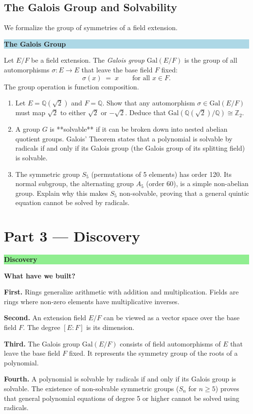 \documentclass[12pt, a4paper]{article}
\newenvironment{discoverybox}
  {\par\medskip\fillcolorbox{LightGreen}{DiscoveryColor}{Discovery}}
  {\par\medskip}
\newenvironment{namedconcept}[1]
  {\par\medskip\fillcolorbox{LightBlue}{NavyBlue}{#1}}
  {\par\medskip}
\newcommand{\fillcolorbox}[3]{%
  \noindent
  \filldrawbox{#1}{#2}{\textbf{\sffamily\color{white}#3}}\par\nobreak\vspace{4pt}
}
\newcommand{\filldrawbox}[3]{%
  \colorbox{#1}{\parbox{\dimexpr\linewidth-2\fboxsep\relax}{%
    \vspace{4pt}\noindent\hspace{4pt}#3\vspace{4pt}%
  }}%
}
\newcommand{\newterm}[1]{\textit{\textcolor{DiscoveryColor}{#1}}}
\begin{document}
\subsection{The Galois Group and Solvability}

We formalize the group of symmetries of a field extension.

\begin{namedconcept}{The Galois Group}
Let $E/F$ be a field extension. The \newterm{Galois group} $\text{Gal}(E/F)$ is the group of all automorphisms $\sigma: E \to E$ that leave the base field $F$ fixed:
\[
  \sigma(x) \;=\; x \qquad \text{for all } x \in F.
\]
The group operation is function composition.
\end{namedconcept}

\begin{enumerate}[label=(\alph*), leftmargin=*]
  \item Let $E = \mathbb{Q}(\sqrt{2})$ and $F = \mathbb{Q}$. Show that any automorphism $\sigma \in \text{Gal}(E/F)$ must map $\sqrt{2}$ to either $\sqrt{2}$ or $-\sqrt{2}$.
        Deduce that $\text{Gal}(\mathbb{Q}(\sqrt{2})/\mathbb{Q}) \cong \mathbb{Z}_2$.
  \item A group $G$ is **solvable** if it can be broken down into nested abelian quotient groups.
        Galois' Theorem states that a polynomial is solvable by radicals if and only if its Galois group (the Galois group of its splitting field) is solvable.
  \item The symmetric group $S_5$ (permutations of 5 elements) has order 120. Its normal subgroup, the alternating group $A_5$ (order 60), is a simple non-abelian group.
        Explain why this makes $S_5$ non-solvable, proving that a general quintic equation cannot be solved by radicals.
\end{enumerate}

\newpage

\section{Part 3 --- Discovery}

\begin{discoverybox}
\textbf{What have we built?}

\textbf{First.} Rings generalize arithmetic with addition and multiplication. Fields are rings where non-zero elements have multiplicative inverses.

\textbf{Second.} An extension field $E/F$ can be viewed as a vector space over the base field $F$. The degree $[E:F]$ is its dimension.

\textbf{Third.} The Galois group $\text{Gal}(E/F)$ consists of field automorphisms of $E$ that leave the base field $F$ fixed. It represents the symmetry group of the roots of a polynomial.

\textbf{Fourth.} A polynomial is solvable by radicals if and only if its Galois group is solvable. The existence of non-solvable symmetric groups ($S_n$ for $n \ge 5$) proves that general polynomial equations of degree 5 or higher cannot be solved using radicals.
\end{discoverybox}
\end{document}
